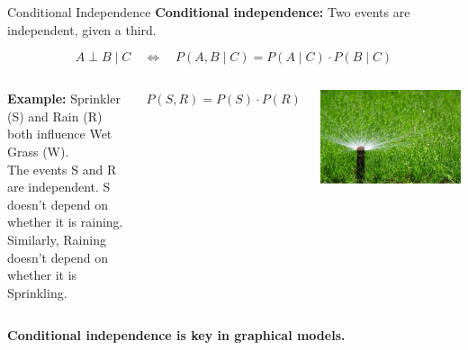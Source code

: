 \documentclass[handout,aspectratio=169]{beamer}
\begin{document}
\begin{frame}{Conditional Independence}
  \textbf{Conditional independence:} Two events are independent, given a third.

  \vspace{1em}
  \[
    A \perp B \mid C \quad \Leftrightarrow \quad P(A, B \mid C) = P(A \mid C) \cdot P(B \mid C)
  \]

  \vspace{1em}
  \begin{columns}
\textbf{Example:} Sprinkler (S) and Rain (R) both influence Wet Grass (W).\\
  The events S and R are independent. S doesn't depend on whether it is raining. Similarly, Raining doesn't depend on whether it is Sprinkling.

  \vspace{0.5em}
  $P(S,R) = P(S) \cdot P(R)$
  
    \includegraphics[width=\linewidth]{figs/grass.jpg}
\end{columns}
  

  \vspace{1em}
  \textbf{Conditional independence is key in graphical models.}
\end{frame}
\end{document}
